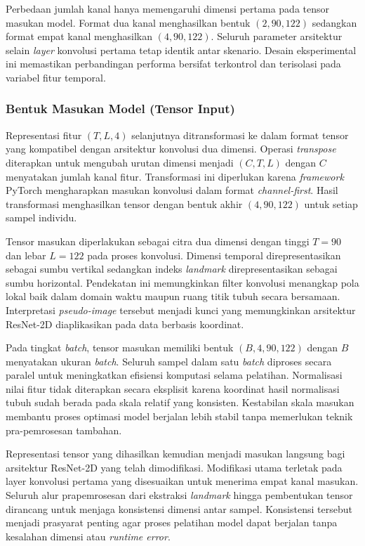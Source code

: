 Perbedaan jumlah kanal hanya memengaruhi dimensi pertama pada tensor masukan model. 
Format dua kanal menghasilkan bentuk $(2, 90, 122)$ sedangkan format empat kanal menghasilkan $(4, 90, 122)$. 
Seluruh parameter arsitektur selain \textit{layer} konvolusi pertama tetap identik antar skenario. 
Desain eksperimental ini memastikan perbandingan performa bersifat terkontrol dan terisolasi pada variabel fitur temporal.

\subsubsection{Bentuk Masukan Model (Tensor Input)}
\label{subsubsec:tensor-input}
Representasi fitur $(T, L, 4)$ selanjutnya ditransformasi ke dalam format tensor yang kompatibel dengan arsitektur konvolusi dua dimensi. 
Operasi \textit{transpose} diterapkan untuk mengubah urutan dimensi menjadi $(C, T, L)$ dengan $C$ menyatakan jumlah kanal fitur. 
Transformasi ini diperlukan karena \textit{framework} PyTorch mengharapkan masukan konvolusi dalam format \textit{channel-first}. 
Hasil transformasi menghasilkan tensor dengan bentuk akhir $(4, 90, 122)$ untuk setiap sampel individu.

Tensor masukan diperlakukan sebagai citra dua dimensi dengan tinggi $T=90$ dan lebar $L=122$ pada proses konvolusi. 
Dimensi temporal direpresentasikan sebagai sumbu vertikal sedangkan indeks \textit{landmark} direpresentasikan sebagai sumbu horizontal. 
Pendekatan ini memungkinkan filter konvolusi menangkap pola lokal baik dalam domain waktu maupun ruang titik tubuh secara bersamaan. 
Interpretasi \textit{pseudo-image} tersebut menjadi kunci yang memungkinkan arsitektur ResNet-2D diaplikasikan pada data berbasis koordinat.

Pada tingkat \textit{batch}, tensor masukan memiliki bentuk $(B, 4, 90, 122)$ dengan $B$ menyatakan ukuran \textit{batch}. 
Seluruh sampel dalam satu \textit{batch} diproses secara paralel untuk meningkatkan efisiensi komputasi selama pelatihan. 
Normalisasi nilai fitur tidak diterapkan secara eksplisit karena koordinat hasil normalisasi tubuh sudah berada pada skala relatif yang konsisten. 
Kestabilan skala masukan membantu proses optimasi model berjalan lebih stabil tanpa memerlukan teknik pra-pemrosesan tambahan.

Representasi tensor yang dihasilkan kemudian menjadi masukan langsung bagi arsitektur ResNet-2D yang telah dimodifikasi. 
Modifikasi utama terletak pada layer konvolusi pertama yang disesuaikan untuk menerima empat kanal masukan. 
Seluruh alur prapemrosesan dari ekstraksi \textit{landmark} hingga pembentukan tensor dirancang untuk menjaga konsistensi dimensi antar sampel. 
Konsistensi tersebut menjadi prasyarat penting agar proses pelatihan model dapat berjalan tanpa kesalahan dimensi atau \textit{runtime error}.

